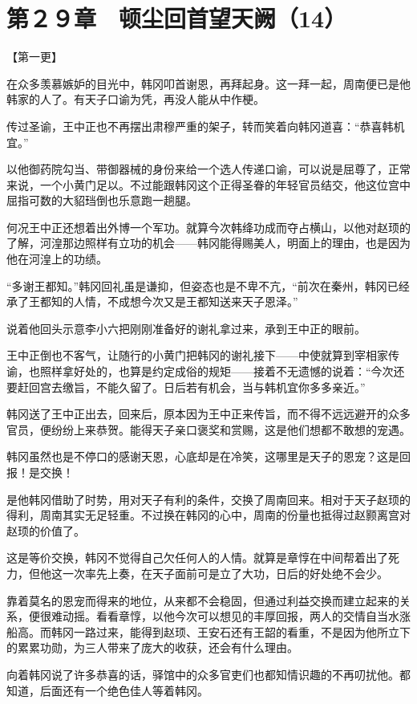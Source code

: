 \section{第２９章　顿尘回首望天阙（14）}

【第一更】

在众多羡慕嫉妒的目光中，韩冈叩首谢恩，再拜起身。这一拜一起，周南便已是他韩家的人了。有天子口谕为凭，再没人能从中作梗。

传过圣谕，王中正也不再摆出肃穆严重的架子，转而笑着向韩冈道喜：“恭喜韩机宜。”

以他御药院勾当、带御器械的身份来给一个选人传递口谕，可以说是屈尊了，正常来说，一个小黄门足以。不过能跟韩冈这个正得圣眷的年轻官员结交，他这位宫中屈指可数的大貂珰倒也乐意跑一趟腿。

何况王中正还想着出外博一个军功。就算今次韩绛功成而夺占横山，以他对赵顼的了解，河湟那边照样有立功的机会——韩冈能得赐美人，明面上的理由，也是因为他在河湟上的功绩。

“多谢王都知。”韩冈回礼虽是谦抑，但姿态也是不卑不亢，“前次在秦州，韩冈已经承了王都知的人情，不成想今次又是王都知送来天子恩泽。”

说着他回头示意李小六把刚刚准备好的谢礼拿过来，承到王中正的眼前。

王中正倒也不客气，让随行的小黄门把韩冈的谢礼接下——中使就算到宰相家传谕，也照样拿好处的，也算是约定成俗的规矩——接着不无遗憾的说着：“今次还要赶回宫去缴旨，不能久留了。日后若有机会，当与韩机宜你多多亲近。”

韩冈送了王中正出去，回来后，原本因为王中正来传旨，而不得不远远避开的众多官员，便纷纷上来恭贺。能得天子亲口褒奖和赏赐，这是他们想都不敢想的宠遇。

韩冈虽然也是不停口的感谢天恩，心底却是在冷笑，这哪里是天子的恩宠？这是回报！是交换！

是他韩冈借助了时势，用对天子有利的条件，交换了周南回来。相对于天子赵顼的得利，周南其实无足轻重。不过换在韩冈的心中，周南的份量也抵得过赵颢离宫对赵顼的价值了。

这是等价交换，韩冈不觉得自己欠任何人的人情。就算是章惇在中间帮着出了死力，但他这一次率先上奏，在天子面前可是立了大功，日后的好处绝不会少。

靠着莫名的恩宠而得来的地位，从来都不会稳固，但通过利益交换而建立起来的关系，便很难动摇。看看章惇，以他今次可以想见的丰厚回报，两人的交情自当水涨船高。而韩冈一路过来，能得到赵顼、王安石还有王韶的看重，不是因为他所立下的累累功勋，为三人带来了庞大的收获，还会有什么理由。

向着韩冈说了许多恭喜的话，驿馆中的众多官吏们也都知情识趣的不再叨扰他。都知道，后面还有一个绝色佳人等着韩冈。

